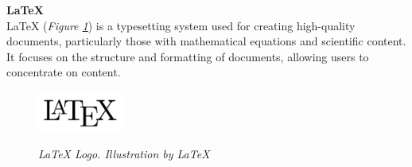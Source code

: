 \vspace{0.5cm}
\textbf{LaTeX} \\

LaTeX (\textit{Figure \ref{fig:latex-logo}}) is a typesetting system used for creating high-quality documents, particularly those with mathematical equations and scientific content. It focuses on the structure and formatting of documents, allowing users to concentrate on content.

\begin{figure}[H]
\centering
\begin{adjustbox}{trim=0cm 0cm, clip}
\includegraphics[width=0.25\textwidth]{imatges/studies_and_decisions/latex-logo.png}
\end{adjustbox}
\caption[LaTeX Logo]{\textit{LaTeX Logo. Illustration by LaTeX}}
{\label{fig:latex-logo}}
\end{figure}
